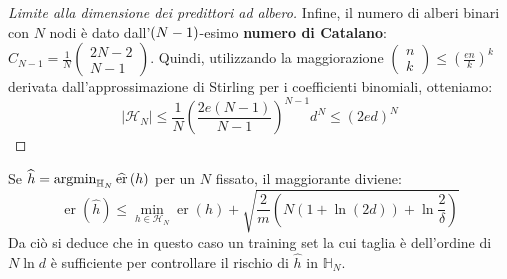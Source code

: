 \documentclass[\main/main.tex]{subfiles}
\begin{document}
\begin{multicols}{2}
\begin{proof}[Limite alla dimensione dei predittori ad albero]
        Infine, il numero di alberi binari con \(N\) nodi è dato dall'\(\left(N-1\right)\)-esimo \textbf{numero di Catalano}: \(C_{N-1}=\frac{1}{N} \left( \begin{array}{c}{2 N-2} \\ {N-1}\end{array}\right)\). Quindi, utilizzando la maggiorazione \(\left( \begin{array}{l}{n} \\ {k}\end{array}\right) \leq\left(\frac{e n}{k}\right)^{k}\) derivata dall'approssimazione di Stirling per i coefficienti binomiali, otteniamo:
        \[
            \left|\mathcal{H}_{N}\right| \leq \frac{1}{N}\left(\frac{2 e(N-1)}{N-1}\right)^{N-1} d^{N} \leq(2 e d)^{N}
        \]
    \end{proof}
\end{multicols}
\begin{observation}
    Se \(\widehat{h} = \operatorname*{argmin}_{\mathbb{H}_N}\widehat{\text{er}}\left(h\right)\) per un \(N\) fissato, il maggiorante diviene:
    \[
        \operatorname{er}(\widehat{h}) \leq \min _{h \in \mathcal{H}_{N}} \operatorname{er}(h)+\sqrt{\frac{2}{m}\left(N(1+\ln (2 d))+\ln \frac{2}{\delta}\right)}
    \]
    Da ciò si deduce che in questo caso un training set la cui taglia è dell'ordine di \(N\ln d\) è sufficiente per controllare il rischio di \(\hat{h}\) in \(\mathbb{H}_N\).
\end{observation}
\end{document}
